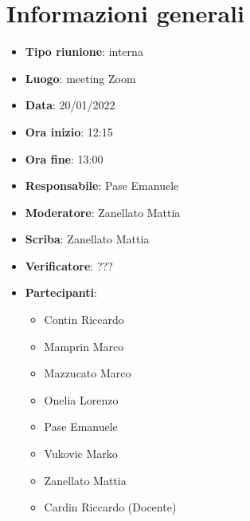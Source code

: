 \section{Informazioni generali}
\begin{itemize}
  \item \textbf{Tipo riunione}: interna
  \item \textbf{Luogo}: meeting Zoom
  \item \textbf{Data}: 20/01/2022
  \item \textbf{Ora inizio}: 12:15
  \item \textbf{Ora fine}: 13:00
  \item \textbf{Responsabile}: Pase Emanuele
  \item \textbf{Moderatore}: Zanellato Mattia
  \item \textbf{Scriba}: Zanellato Mattia
  \item \textbf{Verificatore}: ???
  \item \textbf{Partecipanti}:
  \begin{itemize}
    \item Contin Riccardo
    \item Mamprin Marco
    \item Mazzucato Marco
    \item Onelia Lorenzo
    \item Pase Emanuele
    \item Vukovic Marko
    \item Zanellato Mattia
    \item Cardin Riccardo (Docente)
  \end{itemize}
\end{itemize}
